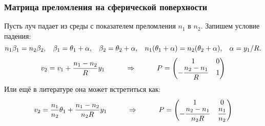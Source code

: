 \subsubsection*{Матрица преломления на сферической поверхности}

Пусть луч падает из среды с показателем преломления $n_1$ в $n_2$. Запишем условие падения:
\begin{equation*}
	n_1 \beta_1 = n_2 \beta_2,
	\hspace{0.3 cm}
	\beta_1 = \theta_1 + \alpha,
	\hspace{0.3 cm}
	\beta_2 = \theta_2 + \alpha,
	\hspace{0.3 cm}
	n_1 (\theta_1 + \alpha) = n_2 (\theta_2 + \alpha),
	\hspace{0.3 cm}
	\alpha = y_1/R.
\end{equation*}
\begin{equation*}
	v_2 = v_1 + \dfrac{n_1 - n_2}{R}y_1
	\hspace{1 cm}
	\Rightarrow
	\hspace{1 cm}
	P= \begin{pmatrix}
		1 & 0 \\ -\dfrac{n_2 - n_1}{R} & 1
	\end{pmatrix}
\end{equation*}
Или ещё в литературе она может встретиться как:
\begin{equation*}
	v_2 = \frac{n_1}{n_2} \theta_1 + \frac{n_1 - n_2}{n_2 R}y_1
	\hspace{1 cm}
	\Rightarrow
	\hspace{1 cm}
	P =\begin{pmatrix}
		1 & 0 \\ -\dfrac{n_2 - n_1}{n_2 R} & \dfrac{n_1}{n_2}
	\end{pmatrix}
\end{equation*}

